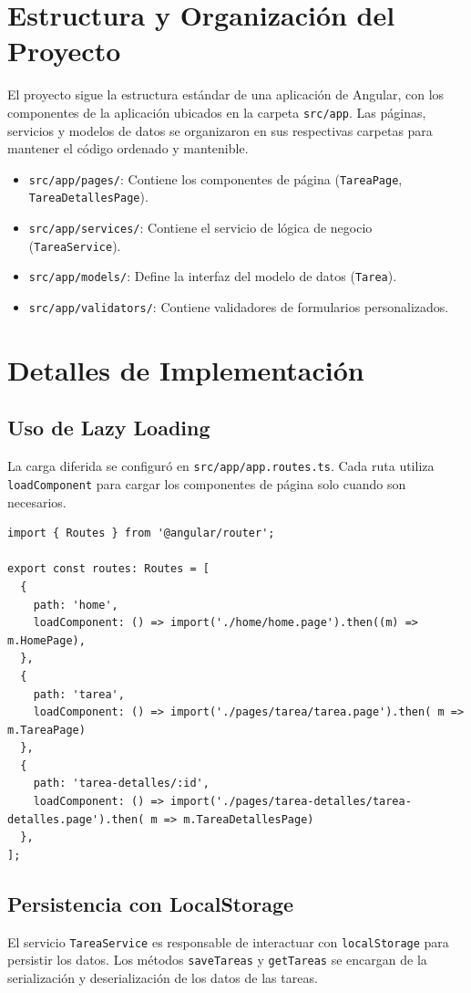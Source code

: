 \documentclass{article}
\begin{document}
\section{Estructura y Organizaci\'on del Proyecto}
El proyecto sigue la estructura est\'andar de una aplicaci\'on de Angular, con los componentes de la aplicaci\'on ubicados en la carpeta \texttt{src/app}. Las p\'aginas, servicios y modelos de datos se organizaron en sus respectivas carpetas para mantener el c\'odigo ordenado y mantenible.

\begin{itemize}
    \item \texttt{src/app/pages/}: Contiene los componentes de p\'agina (\texttt{TareaPage}, \texttt{TareaDetallesPage}).
    \item \texttt{src/app/services/}: Contiene el servicio de l\'ogica de negocio (\texttt{TareaService}).
    \item \texttt{src/app/models/}: Define la interfaz del modelo de datos (\texttt{Tarea}).
    \item \texttt{src/app/validators/}: Contiene validadores de formularios personalizados.
\end{itemize}

\section{Detalles de Implementaci\'on}

\subsection{Uso de Lazy Loading}
La carga diferida se configur\'o en \texttt{src/app/app.routes.ts}. Cada ruta utiliza \texttt{loadComponent} para cargar los componentes de p\'agina solo cuando son necesarios.

\begin{lstlisting}[breaklines=true]
import { Routes } from '@angular/router';

export const routes: Routes = [
  {
    path: 'home',
    loadComponent: () => import('./home/home.page').then((m) => m.HomePage),
  },
  {
    path: 'tarea',
    loadComponent: () => import('./pages/tarea/tarea.page').then( m => m.TareaPage)
  },
  {
    path: 'tarea-detalles/:id',
    loadComponent: () => import('./pages/tarea-detalles/tarea-detalles.page').then( m => m.TareaDetallesPage)
  },
];
\end{lstlisting}

\subsection{Persistencia con LocalStorage}
El servicio \texttt{TareaService} es responsable de interactuar con \texttt{localStorage} para persistir los datos. Los m\'etodos \texttt{saveTareas} y \texttt{getTareas} se encargan de la serializaci\'on y deserializaci\'on de los datos de las tareas.
\end{document}
